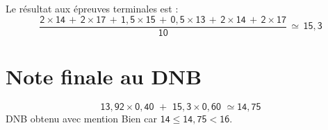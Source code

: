 \documentclass[11pt,a5paper]{article}
\begin{document}
Le résultat aux épreuves terminales est :
\[\mathsf{
	\dfrac{
		2 \times 14 \, + \, 2 \times 17 \, + \, 1,5 \times 15 \, + \, 0,5 \times 13 \, + \, 2 \times 14 \, + \, 2 \times 17
	}{10} \, \simeq \, 15,3
}\]

\vspace{1.3em}
\section*{Note finale au DNB}
\[ \mathsf{13,92 \times 0,40 \,\, + \,\, 15,3 \times 0,60 \,\, \simeq 14,75 }\]
\vspace{0,4em}
DNB obtenu avec mention Bien car $\mathsf{14 \leq 14,75 < 16}$.
\end{document}
